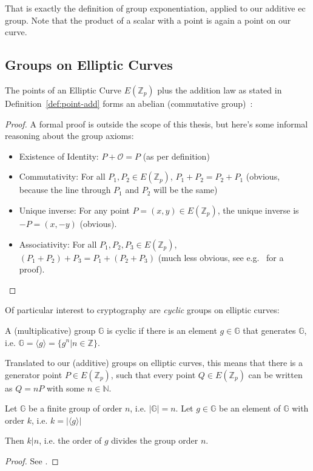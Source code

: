That is exactly the definition of group exponentiation, applied to our additive \Gls{ec} group. Note that the product of a scalar with a point is again a point on our curve.
\\

\subsection{Groups on Elliptic Curves}
\begin{theorem}
    The points of an Elliptic Curve $E(\mathbb{Z}_p)$ plus the addition law as stated in Definition~\ref{def:point-add} forms an abelian (commutative group)~\cite{katz_introduction_2015, washington_elliptic_2008}:
\end{theorem}
\begin{proof}
    A formal proof is outside the scope of this thesis, but here's some informal reasoning about the group axioms:
    \begin{itemize}
        \item Existence of Identity: $P + \mathcal{O} = P$ (as per definition)
        \item Commutativity: For all $P_1, P_2 \in E(\mathbb{Z}_p)$, $P_1 + P_2 = P_2 + P_1$ (obvious, because the line through $P_1$ and $P_2$ will be the same)
        \item Unique inverse: For any point $P = (x,y) \in E(\mathbb{Z}_p)$, the unique inverse is $-P = (x, -y)$ (obvious).
        \item Associativity: For all $P_1, P_2, P_3 \in E(\mathbb{Z}_p)$, $(P_1 + P_2) + P_3 = P_1 + (P_2 + P_3)$ (much less obvious, see e.g.~\cite[Chapter 2.4]{washington_elliptic_2008} for a proof).
    \end{itemize}
\end{proof}

Of particular interest to cryptography are \emph{cyclic} groups on elliptic curves:
\begin{definition}
    A (multiplicative) group $\mathbb{G}$ is cyclic if there is an element $g \in \mathbb{G}$ that generates $\mathbb{G}$, i.e. $\mathbb{G} = \langle g \rangle = \{g^n | n \in \mathbb{Z}\}$.
\end{definition}

Translated to our (additive) groups on elliptic curves, this means that there is a generator point $P \in E(\mathbb{Z}_p)$, such that every point $Q \in E(\mathbb{Z}_p)$ can be written as $Q = nP$ with some $n \in \mathbb{N}$.

\begin{theorem}\cite{katz_introduction_2015}
    Let $\mathbb{G}$ be a finite group of order $n$, i.e. $|\mathbb{G}| = n$.
    Let $g \in \mathbb{G}$ be an element of $\mathbb{G}$ with order $k$, i.e. $k = |\langle g \rangle |$

    Then $k|n$, i.e. the order of $g$ divides the group order $n$.
\end{theorem}
\begin{proof}
    See \cite*[Proposition 8.54]{katz_introduction_2015}.
\end{proof}

